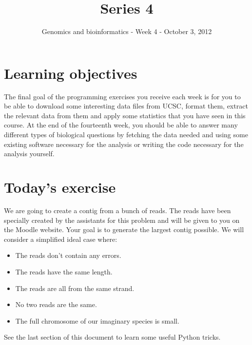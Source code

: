\documentclass[a4paper,11pt]{article}
\title{Series 4}
\date{}
\author{Genomics and bioinformatics - Week 4 - October 3, 2012}
\begin{document}
\maketitle

\section{Learning objectives}
The final goal of the programming exercises you receive each week is for you to be able to download some interesting data files from UCSC, format them, extract the relevant data from them and apply some statistics that you have seen in this course. At the end of the fourteenth week, you should be able to answer many different types of biological questions by fetching the data needed and using some existing software necessary for the analysis or writing the code necessary for the analysis yourself.

\section{Today's exercise}
We are going to create a contig from a bunch of reads. The reads have been specially created by the assistants for this problem and will be given to you on the Moodle website. Your goal is to generate the largest contig possible. We will consider a simplified ideal case where:
\begin{itemize}
\item The reads don't contain any errors.
\item The reads have the same length.
\item The reads are all from the same strand.
\item No two reads are the same.
\item The full chromosome of our imaginary species is small.
\end{itemize}
See the last section of this document to learn some useful Python tricks.
\end{document}
